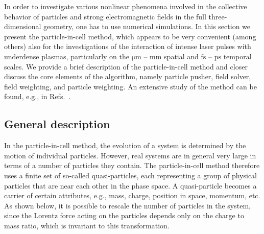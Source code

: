 \documentclass[10pt, a4paper, twoside, openright]{report}
\begin{document}



In order to investigate various nonlinear phenomena involved in the collective behavior of particles and strong electromagnetic fields in the full three-dimensional geometry, one has to use numerical simulations. In this section we present the particle-in-cell method, which appears to be very convenient (among others) also for the investigations of the interaction of intense laser pulses with underdense plasmas, particularly on the $ \mathrm{\mu m} $ -- $ \mathrm{mm} $ spatial and $ \mathrm{fs} $ -- $ \mathrm{ps} $ temporal scales. We provide a brief description of the particle-in-cell method and closer discuss the core elements of the algorithm, namely particle pusher, field solver, field weighting, and particle weighting. An extensive study of the method can be found, e.g., in Refs.~.

\subsection{General description}

In the particle-in-cell method, the evolution of a system is determined by the motion of individual particles. However, real systems are in general very large in terms of a number of particles they contain. The particle-in-cell method therefore uses a finite set of so-called quasi-particles, each representing a group of physical particles that are near each other in the phase space. A quasi-particle becomes a carrier of certain attributes, e.g., mass, charge, position in space, momentum, etc. As shown below, it is possible to rescale the number of particles in the system, since the Lorentz force acting on the particles depends only on the charge to mass ratio, which is invariant to this transformation. 
\end{document}

